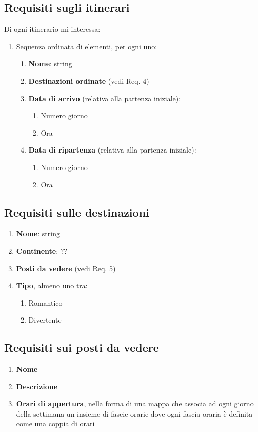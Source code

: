 \documentclass[a4paper]{scrartcl}
\begin{document}
\subsection{Requisiti sugli itinerari}
Di ogni itinerario mi interessa:
\begin{enumerate}
    \item Sequenza ordinata di elementi, per ogni uno:
    \begin{enumerate}
        \item \textbf{Nome}: string
        \item \textbf{Destinazioni ordinate} (vedi Req. 4)
        \item \textbf{Data di arrivo} (relativa alla partenza iniziale):
        \begin{enumerate}
            \item Numero giorno
            \item Ora
        \end{enumerate}
        \item \textbf{Data di ripartenza} (relativa alla partenza iniziale):
        \begin{enumerate}
            \item Numero giorno
            \item Ora
        \end{enumerate}
    \end{enumerate}
\end{enumerate}

\subsection{Requisiti sulle destinazioni}
\begin{enumerate}
    \item \textbf{Nome}: string
    \item \textbf{Continente}: ??
    \item \textbf{Posti da vedere} (vedi Req. 5)
    \item \textbf{Tipo}, almeno uno tra:
    \begin{enumerate}
        \item Romantico
        \item Divertente
    \end{enumerate}
\end{enumerate}

\subsection{Requisiti sui posti da vedere}
\begin{enumerate}
    \item \textbf{Nome}
    \item \textbf{Descrizione}
    \item \textbf{Orari di appertura}, nella forma di una mappa che associa ad ogni giorno della settimana un insieme di fascie orarie dove ogni fascia oraria è definita come una coppia di orari
\end{enumerate}
\end{document}

